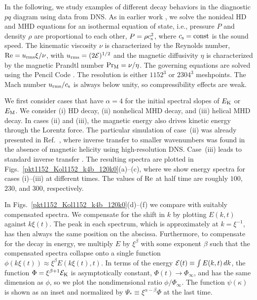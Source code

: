 \documentclass[prl,twocolumn,aps,psfig,showpacs,nofootinbib,nobibnotes,superscriptaddress,preprintnumbers,times]{revtex4}
\newcommand{\const}{{\rm const}{}}
\def\urms{u_{\rm rms}}
\def\cs{c_{\rm s}}
\newcommand{\Figssp}[3]{Figs.~\ref{#1}({#2})--({#3})}
\def\EK{E_{\rm K}}
\def\EM{E_{\rm M}}
\def\Pm{\mbox{\rm Pr}_{\rm M}}
\def\Rey{\mbox{\rm Re}}
\begin{document}
In the following, we study examples of different decay behaviors
in the diagnostic $pq$ diagram using data from DNS.
As in earlier work \cite{TKBK12}, we solve the nonideal HD and MHD
equations for an isothermal equation of state, i.e., pressure $P$ and
density $\rho$ are proportional to each other, $P=\rho\cs^2$, where
$\cs=\const$ is the sound speed.
The kinematic viscosity $\nu$ is characterized by the Reynolds
number, $\Rey=\urms\xi/\nu$, with $\urms=(2{\cal E})^{1/2}$ and the
magnetic diffusivity $\eta$ is characterized by the magnetic Prandtl
number $\Pm=\nu/\eta$.
The governing equations are solved using the {\sc Pencil Code} \cite{PC,suppl}.
The resolution is either $1152^3$ or $2304^3$ meshpoints.
The Mach number $\urms/\cs$ is always below unity, so
compressibility effects are weak.

We first consider cases that have $\alpha=4$ for the initial spectral
slopes of $\EK$ or $\EM$.
We consider (i) HD decay, (ii) nonhelical MHD decay,
and (iii) helical MHD decay.
In cases (ii) and (iii), the magnetic energy also drives kinetic
energy through the Lorentz force.
The particular simulation of case~(ii) was already presented in
Ref.~\cite{BKT15}, where inverse transfer to smaller wavenumbers was
found in the absence of magnetic helicity using high-resolution DNS.
Case~(iii) leads to standard inverse transfer \cite{PFL76,BM99,CHB01,BJ04}.
The resulting spectra are plotted in \Figssp{pkt1152_Kol1152_k4b_120k0}{a}{c},
where we show energy spectra for cases (i)--(iii) at different times.
The values of $\Rey$ at half time are roughly $100$, $230$, and $300$,
respectively.

In \Figssp{pkt1152_Kol1152_k4b_120k0}{d}{f} we compare with suitably
compensated spectra.
We compensate for the shift in $k$ by plotting $E(k,t)$
against $k\xi(t)$.
The peak in each spectrum, which is approximately at
$k=\xi^{-1}$, has then always the same position on the abscissa.
Furthermore, to compensate for the decay in energy, we multiply $E$
by $\xi^\beta$ with some exponent $\beta$ such that the
compensated spectra collapse onto a single function
$\phi(k\xi(t))\approx\xi^\beta E(k\xi(t),t)$.
In terms of the energy ${\cal E}(t)\equiv\int E(k,t)\,dk$, the function
$\Phi=\xi^{\beta+1}{\cal E}_{\rm K}$ is asymptotically constant,
$\Phi(t)\to\Phi_\infty$, and has the same dimension as $\phi$,
so we plot the nondimensional ratio $\phi/\Phi_\infty$.
The function $\psi(\kappa)$ is shown as an inset and normalized
by $\Psi_\ast\equiv\xi^{\alpha-\beta}\Phi$ at the last time.
\end{document}
